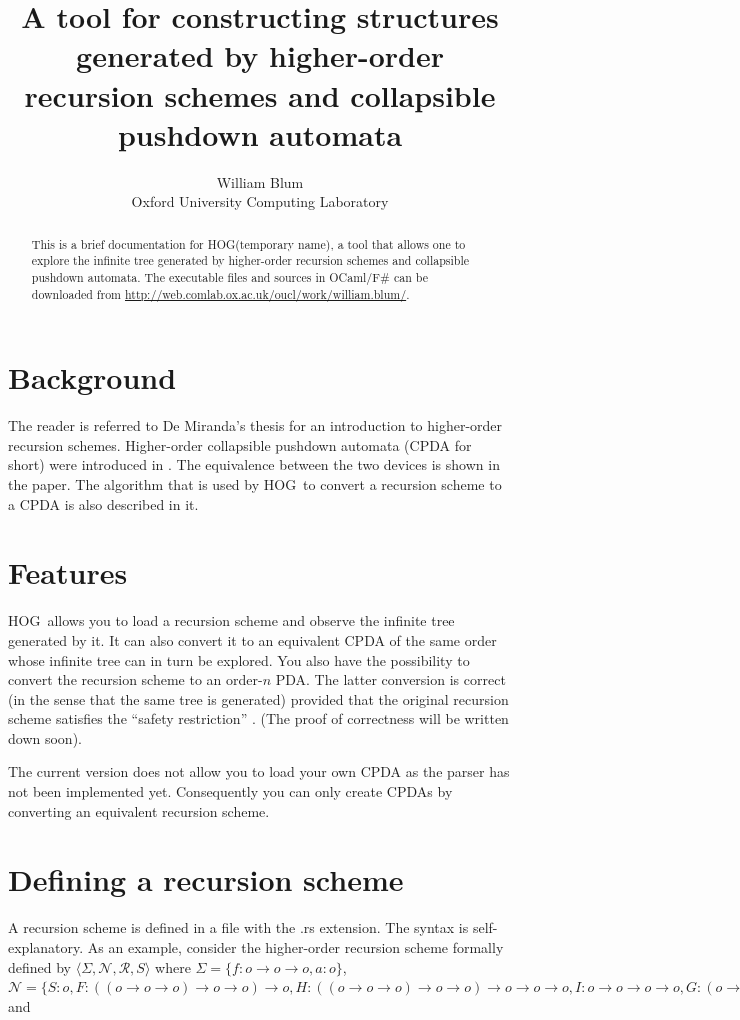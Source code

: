 \documentclass{article}
\author{William Blum\\ Oxford University Computing Laboratory}
\title{A tool for constructing structures generated by higher-order recursion schemes and collapsible pushdown automata}
\def\toolname{HOG}
\begin{document}
\maketitle
\begin{abstract}
This is a brief documentation for \toolname (temporary name), a tool that allows one to explore the
infinite tree generated by higher-order recursion schemes and collapsible pushdown automata.
 The executable files and sources in OCaml/F\# can be downloaded from \url{http://web.comlab.ox.ac.uk/oucl/work/william.blum/}.

\end{abstract}

\section{Background}
The reader is referred to De Miranda's thesis \cite{demirandathesis} for an introduction to higher-order recursion schemes. Higher-order collapsible pushdown automata (CPDA for short) were introduced in \cite{hmos-lics08}. The equivalence between the two devices is shown in the paper.
The algorithm that is used by \toolname\ to convert a recursion scheme to a CPDA is also described in
it.

\section{Features}

\toolname\ allows you to load a recursion scheme and observe the infinite tree generated by it.
It can also convert it to an equivalent CPDA of the same order whose infinite tree can in turn be explored. You also have the possibility to convert the recursion scheme to an order-$n$ PDA. The latter conversion is correct (in the sense that the same tree is generated) provided that the original recursion scheme satisfies the ``safety restriction'' \cite{KNU02}. (The proof of correctness will be written down soon).

The current version does not allow you to load your own CPDA as the parser has not been implemented yet. Consequently you can only create CPDAs by converting an equivalent recursion scheme.


\section{Defining a recursion scheme}
\label{sec:defrecscheme}
A recursion scheme is defined in a file with the .rs extension.
The syntax is self-explanatory. As an example, consider the higher-order recursion scheme formally defined by
$\langle \Sigma, \mathcal{N}, \mathcal{R}, S \rangle $
where $\Sigma = \{f:o\rightarrow o\rightarrow o, a:o \}$, $\mathcal{N} = \{
S: o, F: ((o \rightarrow o \rightarrow o)\rightarrow o\rightarrow o) \rightarrow o, H: ((o \rightarrow o \rightarrow o)\rightarrow o\rightarrow o) \rightarrow o \rightarrow o \rightarrow o, I: o \rightarrow o \rightarrow o \rightarrow o,
    G: (o \rightarrow o \rightarrow o)\rightarrow o\rightarrow o \}$ and
\end{document}
